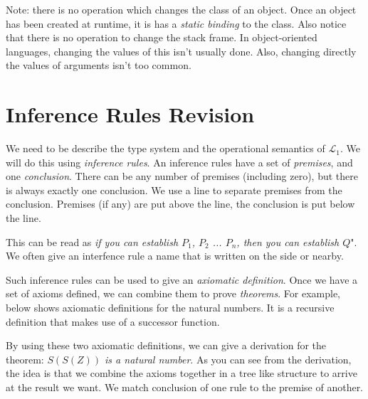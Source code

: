 


Note: there is no operation which changes the class of an object.
Once an object has been created at runtime, it is has a \textit{static binding}
to the class. Also notice that there is no operation to change the stack frame.
In object-oriented languages, changing the values of this isn't usually done.
Also, changing directly the values of arguments isn't too common. 



\section{Inference Rules Revision}

We need to be describe the type system and the operational semantics of $\mathcal{L}_1$.
We will do this using \textit{inference rules}. An
inference rules have a set of \textit{premises}, and one \textit{conclusion}.
There can be any number of premises (including zero), 
but there is always exactly one conclusion. 
We use a line to separate premises from the conclusion. 
Premises (if any) are put above the line, the conclusion is put below the line.


This can be read as \textit{if you can establish $P_1$, $P_2$ ... $P_n$, 
then you can establish $Q$}". We often give an interfence rule a name 
that is written on the side or nearby.

Such inference rules can be used to give an \textit{axiomatic deﬁnition}.
Once we have a set of axioms defined, we can combine 
them to prove \textit{theorems}. For example, below shows 
axiomatic definitions for the natural numbers. 
It is a recursive definition that makes use of a successor function.

{}

{}

By using these two axiomatic definitions, we
can give a derivation for the theorem: \textit{$S(S(Z))$ is a natural number}.
As you can see from the derivation, the idea is that we combine the axioms 
together in a tree like structure to arrive at the result we want. 
We match conclusion of one rule to the premise of another. 

